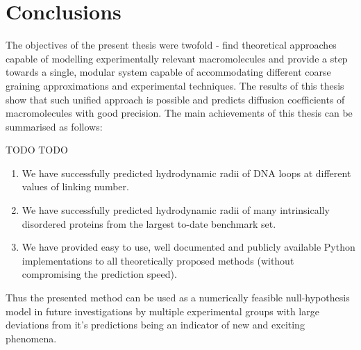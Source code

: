 \documentclass{doctoral}
\begin{document}
\chapter{Conclusions}

The objectives of the present thesis were twofold - find theoretical approaches capable of modelling experimentally relevant macromolecules and provide a step towards a single, modular system capable of accommodating different coarse graining approximations and experimental techniques. The results of this thesis show that such unified approach is possible and predicts diffusion coefficients of macromolecules with good precision. The main achievements of this thesis can be summarised as follows:

TODO TODO
\begin{enumerate}
    \item We have successfully predicted hydrodynamic radii of DNA loops at different values of linking number.
    \item We have successfully predicted hydrodynamic radii of many intrinsically disordered proteins from the largest to-date benchmark set.
    \item We have provided easy to use, well documented and publicly available Python implementations to all theoretically proposed methods (without compromising the prediction speed). 
\end{enumerate}
    
Thus the presented method can be used as a numerically feasible null-hypothesis model in future investigations by multiple experimental groups with large deviations from it's predictions being an indicator of new and exciting phenomena. 

\printbibliography[heading=bibchapter]
\end{document}
